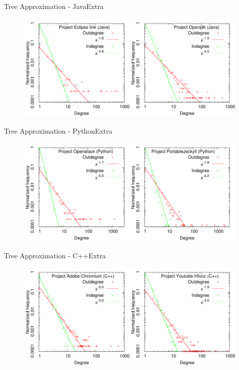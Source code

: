 \documentclass[11pt,svgnames]{beamer}
\begin{document}
\begin{frame}[noframenumbering]{Tree Approximation - Java}{Extra}
\begin{figure}[p]%
\includegraphics[width=12cm,draft=false]{immagini/javainout.pdf}
\end{figure}
\end{frame}
\begin{frame}[noframenumbering]{Tree Approximation - Python}{Extra}
\begin{figure}[p]%
\includegraphics[width=12cm,draft=false]{immagini/pyinout.pdf}
\end{figure}
\end{frame}
\begin{frame}[noframenumbering]{Tree Approximation - C++}{Extra}
\begin{figure}[p]%
\includegraphics[width=12cm,draft=false]{immagini/cppinout.pdf}
\end{figure}
\end{frame}
\end{document}
